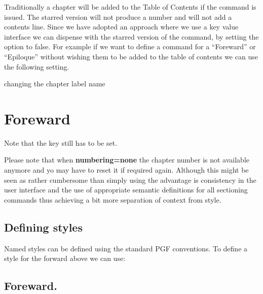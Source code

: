 Traditionally a chapter will be added to the Table of Contents if the  command is issued. The starred version will not produce a number and will not add a contents line. Since we have adopted an approach where we use a key value interface we can dispense with the starred version of the command, by setting the  option to false. For example if we want to define a command for a ``Foreward'' or ``Epiloque'' without wishing them to be added to the table of contents we can use the following setting.



\begin{texexample}{changing the chapter label name}{}
\chapter{Foreward}
\lorem
\end{texexample}

Note that the key  still has to be set.


Please note that when \textbf{numbering=none} the chapter number is not available anymore and yo may have to reset it if required again. Although this might be seen as rather cumbersome than simply using  the advantage is consistency in the user interface and the use of appropriate semantic definitions for all sectioning commands thus achieving a bit more separation of context from style.



\section{Defining styles}

Named styles can be defined using the standard \textsc{PGF} conventions. To define a style for the forward above we can use:

\begin{texexample}{}{}
\chapter{Foreward.}
\lorem
\end{texexample}



